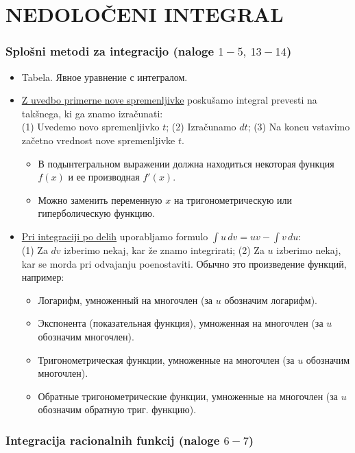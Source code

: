 \section{NEDOLOČENI INTEGRAL}

{\color{Purple} \subsubsection*{Splošni metodi za integracijo (naloge $1-5, \ 13-14$)}}

\begin{itemize}
    \item Tabela. Явное уравнение с интегралом.
    \item \underline{Z uvedbo primerne nove spremenljivke} poskušamo integral prevesti na takšnega, ki ga znamo izračunati: \\ (1) Uvedemo novo spremenljivko $t$; (2) Izračunamo $dt$; (3) Na koncu vstavimo začetno vrednost nove spremenljivke $t$.  
    \begin{itemize}
        \item В подынтегральном выражении должна находиться некоторая функция $f(x)$ и ее производная $f'(x)$.
        \item Можно заменить переменную $x$ на тригонометрическую или гиперболическую функцию.
    \end{itemize}
    \item \underline{Pri integraciji po delih} uporabljamo formulo $\displaystyle \int u  \,dv = uv - \int v \, du$: \\ (1) Za $dv$ izberimo nekaj, kar že znamo integrirati; (2) Za $u$ izberimo nekaj, kar se morda pri odvajanju poenostaviti.
    Обычно это произведение функций, например:
    \begin{itemize}
        \item Логарифм, умноженный на многочлен (за $u$ обозначим логарифм).
        \item Экспонента (показательная функция), умноженная на многочлен (за $u$ обозначим многочлен).
        \item Тригонометрическая функции, умноженные на многочлен (за $u$ обозначим многочлен).
        \item Обратные тригонометрические функции, умноженные на многочлен (за $u$ обозначим обратную триг. функцию).
    \end{itemize}
\end{itemize}
%
%
{\color{Purple} \subsubsection*{Integracija racionalnih funkcij (naloge $6-7$)}}

